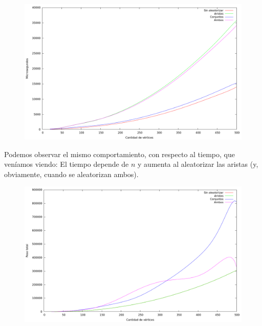 \begin{figure}[H]
  \begin{center}
    \includegraphics[scale=0.35]{imagenes/grasp-goloso-n-tiempo.png}
  \end{center}
\end{figure}

\vspace*{0.5cm}

Podemos observar el mismo comportamiento, con respecto al tiempo, que
veníamos viendo: El tiempo depende de $n$ y aumenta al aleatorizar las aristas
(y, obviamente, cuando se aleatorizan ambos).

\vspace*{0.5cm}

\begin{figure}[H]
  \begin{center}
    \includegraphics[scale=0.35]{imagenes/grasp-goloso-n-peso.png}
  \end{center}
\end{figure}

